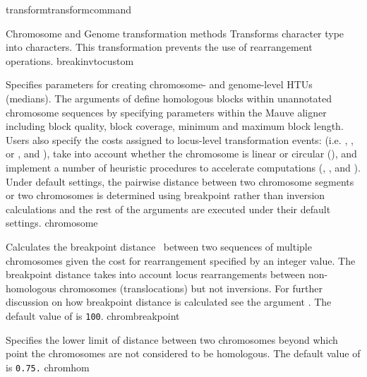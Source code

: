 \begin{command}{transform}{transformcommand}
\begin{arguments}
\begin{argumentgroup}{Chromosome and Genome transformation methods}
                {Transforms  character type into  characters.
                This transformation prevents the use of rearrangement operations.}
                 {breakinvtocustom}

                {Specifies parameters for creating chro\-mosome- and genome-level 
                HTUs (medians). The arguments of  define 
                homologous blocks within unannotated chromosome sequences by
                specifying parameters within the Mauve aligner \cite{darlingetal2004} 
                including block quality, block coverage, minimum and maximum block
                 length. Users also specify the costs assigned to locus-level transformation 
                 events: (i.e. , , or 
                , and ), 
                take into account whether the chromosome is linear or circular 
                (), and implement a number of heuristic 
                procedures to accelerate computations (, 
                , and ).  
                Under default settings, the pairwise distance between two chromosome 
                segments or two chromosomes is determined using breakpoint rather 
                than inversion calculations and the rest of the arguments are executed 
                under their default settings.}
                {chromosome}
             
      		    {Calculates the breakpoint distance~\cite{blanchetteetal1997}
                between two sequences of multiple chromosomes given the cost for
                rearrangement specified by an integer value. The breakpoint distance
                takes into account locus rearrangements between non-homologous
                chromosomes (translocations) but not inversions. For further discussion on 
                how breakpoint distance is calculated see the argument .  
                The default value of  is \texttt{100}.} 
                {chrombreakpoint}
                        
            {Specifies the lower limit of distance between two chromosomes beyond which 
            point the chromosomes are not considered to be homologous. 
            The default value of  is \texttt{0.75.}}
            {chromhom}
      

\end{argumentgroup}
\end{arguments}
\end{command}
